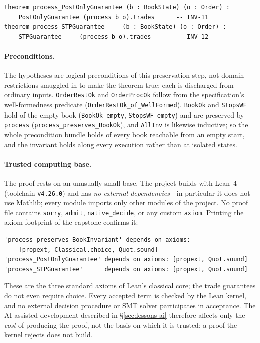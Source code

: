 \documentclass[11pt,a4paper]{article}
\begin{document}
\begin{lstlisting}[language={},basicstyle=\ttfamily\footnotesize]
theorem process_PostOnlyGuarantee (b : BookState) (o : Order) :
    PostOnlyGuarantee (process b o).trades      -- INV-11
theorem process_STPGuarantee     (b : BookState) (o : Order) :
    STPGuarantee     (process b o).trades       -- INV-12
\end{lstlisting}

\paragraph{Preconditions.} The hypotheses are logical preconditions of
this preservation step, not domain restrictions smuggled in to make the
theorem true; each is discharged from ordinary inputs.
\texttt{OrderRestOk} and \texttt{OrderProcOk} follow from the
specification's well-formedness predicate
(\texttt{OrderRestOk\_of\_WellFormed}). \texttt{BookOk} and
\texttt{StopsWF} hold of the empty book (\texttt{BookOk\_empty},
\texttt{StopsWF\_empty}) and are preserved by \texttt{process}
(\texttt{process\_preserves\_BookOk}), and \texttt{AllInv} is likewise
inductive; so the whole precondition bundle holds of every book
reachable from an empty start, and the invariant holds along every
execution rather than at isolated states.

\paragraph{Trusted computing base.} The proof rests on an unusually
small base. The project builds with Lean~4 (toolchain \texttt{v4.26.0})
and has \emph{no external dependencies}---in particular it does not use
Mathlib; every module imports only other modules of the project. No
proof file contains \texttt{sorry}, \texttt{admit},
\texttt{native\_decide}, or any custom \texttt{axiom}. Printing the axiom
footprint of the capstone confirms it:

\begin{lstlisting}[language={},basicstyle=\ttfamily\footnotesize]
'process_preserves_BookInvariant' depends on axioms:
    [propext, Classical.choice, Quot.sound]
'process_PostOnlyGuarantee' depends on axioms: [propext, Quot.sound]
'process_STPGuarantee'      depends on axioms: [propext, Quot.sound]
\end{lstlisting}

\noindent These are the three standard axioms of Lean's classical core;
the trade guarantees do not even require choice. Every accepted term is
checked by the Lean kernel, and no external decision procedure or SMT
solver participates in acceptance. The AI-assisted development described
in \S\ref{sec:lessons-ai} therefore affects only the \emph{cost} of
producing the proof, not the basis on which it is trusted: a proof the
kernel rejects does not build.
\end{document}
